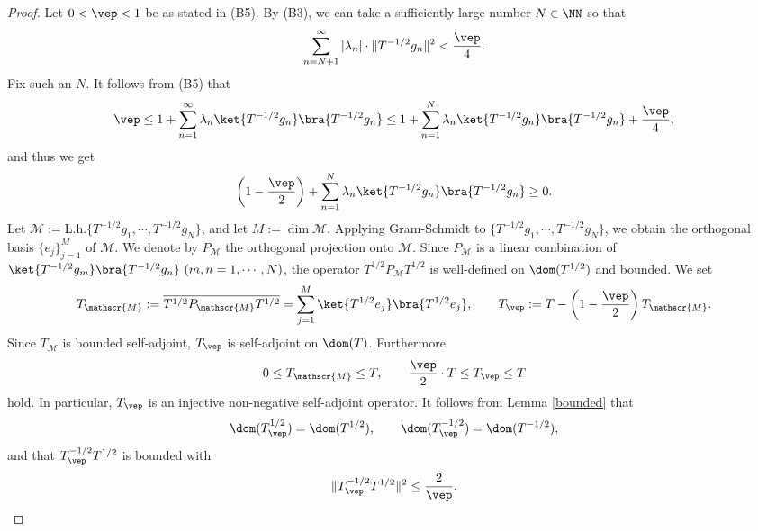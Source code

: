 \documentclass[12pt]{article}
\theoremstyle{plain}
\numberwithin{equation}{section}
\theoremstyle{remark}
\begin{document}
\begin{proof}
Let $0<\vep<1$ be as stated in (B5).
By (B3), we can take a sufficiently large number $N\in\NN$ so that
\begin{equation}\label{vep/4}
\sum_{n=N+1}^\infty|\lambda_n|\cdot\|T^{-1/2}g_n\|^2<\frac{\vep}{4}.
\end{equation}
Fix such an $N$.
It follows from (B5) that
\[
 \vep \leq 1 + \sum_{n=1}^\infty \lambda_n \ket{T^{-1/2}g_n} \bra{T^{-1/2}g_n} 
 \leq 1 + \sum_{n=1}^N \lambda_n \ket{T^{-1/2}g_n} \bra{T^{-1/2}g_n} +\frac{\vep}{4},
\]
and thus we get
\begin{equation}\label{epsilon estimate}
\left(1-\frac{\vep}{2}\right)+\sum_{n=1}^N \lambda_n \ket{T^{-1/2}g_n} \bra{T^{-1/2}g_n} \geq 0.
\end{equation}
Let $\mathscr{M}:=\mathrm{L.h.}\{T^{-1/2}g_1,\cdots,T^{-1/2}g_N\}$, and let $M:=\dim \mathscr{M}$.
Applying Gram-Schmidt to $\{T^{-1/2}g_1,\cdots, T^{-1/2}g_N\}$, we obtain the orthogonal basis $\{e_j\}_{j=1}^M$ of $\mathscr{M}$.
We denote by $P_\mathscr{M}$ the orthogonal projection onto $\mathscr{M}$.
Since $P_\mathscr{M}$ is a linear combination of $\ket{T^{-1/2}g_m}\bra{T^{-1/2}g_n}\ (m,n=1,\cdots,N)$,
the operator $T^{1/2}P_\mathscr{M} T^{1/2}$ is well-defined on $\dom(T^{1/2})$ and bounded.
We set 
\begin{align}
  T_\mathscr{M} := \overline{T^{1/2}P_\mathscr{M} T^{1/2}} 
       = \sum_{j=1}^M \ket{T^{1/2}e_j}\bra{T^{1/2}e_j}, \qquad T_\vep:=T-\left(1-\frac{\vep}{2}\right)T_\mathscr{M}. \label{defTM}
\end{align}
Since $T_\mathscr{M}$ is bounded self-adjoint, $T_\vep$ is self-adjoint on $\dom(T)$.
Furthermore 
\begin{align*}
 0\leq T_\mathscr{M} \leq T, \qquad \frac{\vep}{2}\cdot T \leq T_\vep \leq T
\end{align*}
hold.
In particular, $T_\vep$ is an injective non-negative self-adjoint operator.
It follows from Lemma \ref{bounded} that
\begin{equation}\label{Tvep0}
\dom(T_\vep^{1/2})=\dom(T^{1/2}), \qquad \dom(T_\vep^{-1/2})=\dom(T^{-1/2}),
\end{equation}
and that $T_\vep^{-1/2}T^{1/2}$ is bounded with
\begin{equation}\label{Tvep1}
\|T_\vep^{-1/2}T^{1/2}\|^2\leq\frac{2}{\vep}.
\end{equation}


\end{proof}
\end{document}
